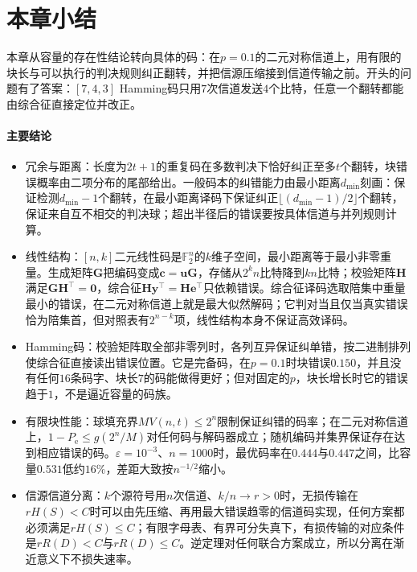 \section{本章小结}
\label{sec:ccode-summary}

本章从容量的存在性结论转向具体的码：在$p=0.1$的二元对称信道上，用有限的块长与可以执行的判决规则纠正翻转，并把信源压缩接到信道传输之前。开头的问题有了答案：$[7,4,3]$ Hamming码只用$7$次信道发送$4$个比特，任意一个翻转都能由综合征直接定位并改正。

\paragraph{主要结论}
\begin{itemize}
 \item 冗余与距离：长度为$2t+1$的重复码在多数判决下恰好纠正至多$t$个翻转，块错误概率由二项分布的尾部给出。一般码本的纠错能力由最小距离$d_{\min}$刻画：保证检测$d_{\min}-1$个翻转，在最小距离译码下保证纠正$\lfloor(d_{\min}-1)/2\rfloor$个翻转，保证来自互不相交的判决球；超出半径后的错误要按具体信道与并列规则计算。

 \item 线性结构：$[n,k]$二元线性码是$\mathbb{F}_2^{n}$的$k$维子空间，最小距离等于最小非零重量。生成矩阵$\bm{G}$把编码变成$\bm{c}=\bm{u}\bm{G}$，存储从$2^{k}n$比特降到$kn$比特；校验矩阵$\bm{H}$满足$\bm{G}\bm{H}^{\top}=\bm{0}$，综合征$\bm{H}\bm{y}^{\top}=\bm{H}\bm{e}^{\top}$只依赖错误。综合征译码选取陪集中重量最小的错误，在二元对称信道上就是最大似然解码；它判对当且仅当真实错误恰为陪集首，但对照表有$2^{n-k}$项，线性结构本身不保证高效译码。

 \item Hamming码：校验矩阵取全部非零列时，各列互异保证纠单错，按二进制排列使综合征直接读出错误位置。它是完备码，在$p=0.1$时块错误$0.150$，并且没有任何$16$条码字、块长$7$的码能做得更好；但对固定的$p$，块长增长时它的错误趋于$1$，不是逼近容量的码族。

 \item 有限块性能：球填充界$MV(n,t)\leq2^{n}$限制保证纠错的码率；在二元对称信道上，$1-P_{\mathrm{e}}\leq g(2^{n}/M)$对任何码与解码器成立；随机编码并集界保证存在达到相应错误的码。$\varepsilon=10^{-3}$、$n=1000$时，最优码率在$0.444$与$0.447$之间，比容量$0.531$低约$16\%$，差距大致按$n^{-1/2}$缩小。

 \item 信源信道分离：$k$个源符号用$n$次信道、$k/n\to r>0$时，无损传输在$rH(S)<C$时可以由先压缩、再用最大错误趋零的信道码实现，任何方案都必须满足$rH(S)\leq C$；有限字母表、有界可分失真下，有损传输的对应条件是$rR(D)<C$与$rR(D)\leq C$。逆定理对任何联合方案成立，所以分离在渐近意义下不损失速率。
\end{itemize}

